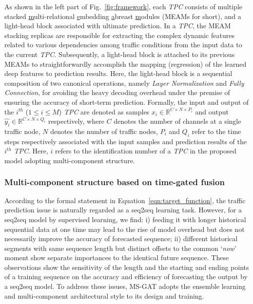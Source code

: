 As shown in the left part of Fig.~\ref{fig:framework}, each \textit{TPC} consists of multiple stacked \underline{m}ulti-relational \underline{e}mbedding \underline{a}breast \underline{m}odules (MEAMs for short), and a light-head block associated with ultimate prediction. In a \textit{TPC}, the MEAM stacking replicas are responsible for extracting the complex dynamic features related to various dependencies among traffic conditions from the input data to the current \textit{TPC}. Subsequently, a light-head block is attached to its previous MEAMs to straightforwardly accomplish the mapping (regression) of the learned deep features to prediction results. Here, the light-head block is a sequential composition of two canonical operations, namely \textit{Layer Normalization} and \textit{Fully Connection}, for avoiding the heavy decoding overhead under the premise of ensuring the accuracy of short-term prediction. Formally, the input and output of the $i^{th}$ ($1 \leq i \leq \mathit{M}$) \textit{TPC} are  denoted as samples $x_i \in \mathbb{R}^{C \times N \times P_i}$ and output $\hat{y_i} \in \mathbb{R}^{C \times N \times Q_i}$ respectively, where $C$ denotes the number of channels at a single traffic node, $N$ denotes the number of traffic nodes, $P_i$ and $Q_i$ refer to the time steps respectively associated with the input samples and prediction results of the $i^{th}$ \textit{TPC}. Here, $i$ refers to the identification number of a \textit{TPC} in the proposed model adopting multi-component structure.  

\subsubsection{Multi-component structure based on time-gated fusion}

According to the formal statement in Equation~\ref{eqn:target_function}, the traffic prediction issue is naturally regarded as a seq2seq learning task. However, for a seq2seq model by supervised learning, we find: i) feeding it with longer historical sequential data at one time may lead to the rise of model overhead but does not necessarily improve the accuracy of forecasted sequence; ii) different historical segments with same sequence length but distinct offsets to the common ‘\textit{now}’ moment show separate importances to the identical future sequence. These observations show the sensitivity of the length and the starting and ending points of a training sequence on the accuracy and efficiency of forecasting the output by a seq2seq model. To address these issues, MS-GAT adopts the ensemble learning and multi-component architectural style to its design and training.

